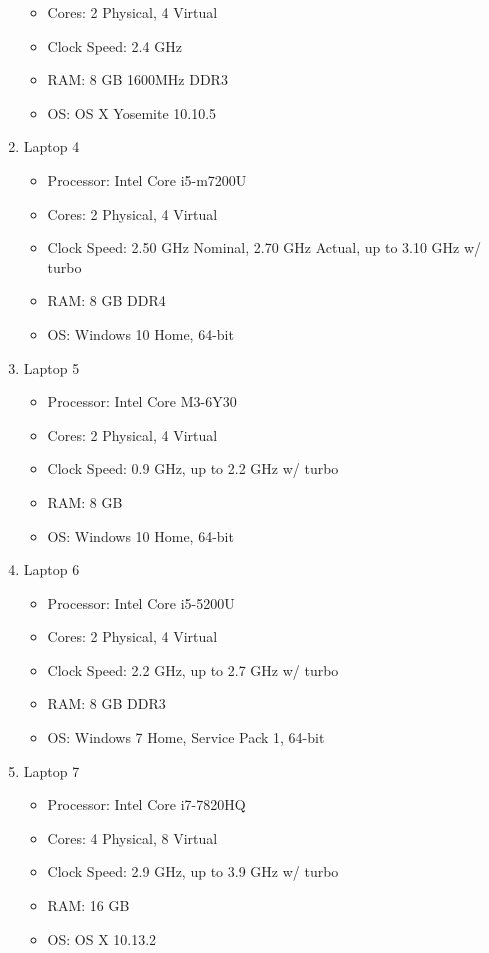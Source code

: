 \documentclass[journal]{IEEEtran}
\begin{document}
\begin{enumerate}
{\begin{itemize}
	\item{Cores: 2 Physical, 4 Virtual}
	\item{Clock Speed: 2.4 GHz}
	\item{RAM: 8 GB 1600MHz DDR3}
	\item{OS: OS X Yosemite 10.10.5}
	\end{itemize}
	}
\item{Laptop 4
	\begin{itemize}
	\item{Processor: Intel Core i5-m7200U}
	\item{Cores: 2 Physical, 4 Virtual}
	\item{Clock Speed: 2.50 GHz Nominal, 2.70 GHz Actual, up to 3.10 GHz w/ turbo}
	\item{RAM: 8 GB DDR4}
	\item{OS: Windows 10 Home, 64-bit}
	\end{itemize}
	}
\item{Laptop 5
	\begin{itemize}
	\item{Processor: Intel Core M3-6Y30}
	\item{Cores: 2 Physical, 4 Virtual}
	\item{Clock Speed: 0.9 GHz, up to 2.2 GHz w/ turbo}
	\item{RAM: 8 GB}
	\item{OS: Windows 10 Home, 64-bit}
	\end{itemize}
	}
\item{Laptop 6
	\begin{itemize}
	\item{Processor: Intel Core i5-5200U}
	\item{Cores: 2 Physical, 4 Virtual}
	\item{Clock Speed: 2.2 GHz, up to 2.7 GHz w/ turbo}
	\item{RAM: 8 GB DDR3}
	\item{OS: Windows 7 Home, Service Pack 1, 64-bit}
	\end{itemize}
	}
\item{Laptop 7
	\begin{itemize}
	\item{Processor: Intel Core i7-7820HQ}
	\item{Cores: 4 Physical, 8 Virtual}
	\item{Clock Speed: 2.9 GHz, up to 3.9 GHz w/ turbo}
	\item{RAM: 16 GB}
	\item{OS: OS X 10.13.2}
	\end{itemize}
}
\end{enumerate}
\end{document}
